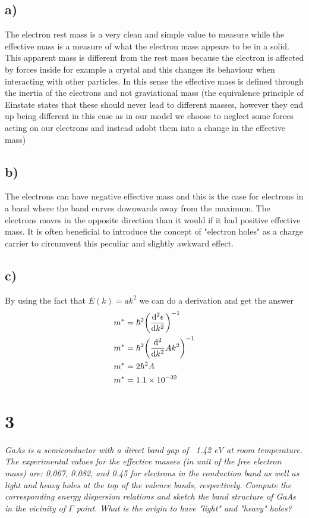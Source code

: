 \documentclass{article}
\newcommand{\bigexp}[2]{\qty(#1)^{#2}}
\begin{document}
\subsection*{a)}
The electron rest mass is a very clean and simple value to measure while the effective mass is a measure of what the electron mass appears to be in a solid. This apparent mass is different from the rest mass because the electron is affected by forces inside for example a crystal and this changes its behaviour when interacting with other particles. In this sense the effective mass is defined through the inertia of the electrons and not graviational mass (the equivalence principle of Einstate states that these should never lead to different masses, however they end up being different in this case as in our model we choose to neglect some forces acting on our electrons and instead adobt them into a change in the effective mass)

\subsection*{b)}
The electrons can have negative effective mass and this is the case for electrons in a band where the band curves downwards away from the maximum. The electrons moves in the opposite direction than it would if it had positive effective mass. It is often beneficial to introduce the concept of "electron holes" as a charge carrier to circumvent this peculiar and slightly awkward effect.

\subsection*{c)}
By using the fact that $E(k) = ak^2$ we can do a derivation and get the answer
\begin{align*}
	m^* &= \hbar^2\bigexp{\dv[2]{\epsilon}{k}}{-1}\\
	m^*&= \hbar^2\bigexp{\dv[2]{}{k}Ak^2}{-1}\\
	m^*&= 2\hbar^2A\\
	m^*&= 1.1\times10^{-32}
\end{align*}

\newpage
\section*{3}

\emph{GaAs is a semiconductor with a direct band gap of ~1.42 eV at room temperature. The
experimental values for the effective masses (in unit of the free electron mass) are: 0.067, 0.082,
and 0.45 for electrons in the conduction band as well as light and heavy holes at the top of the
valence bands, respectively. Compute the corresponding energy dispersion relations and sketch
the band structure of GaAs in the vicinity of $\Gamma$ point. What is the origin to have "light" and
"heavy" holes?}
\end{document}

